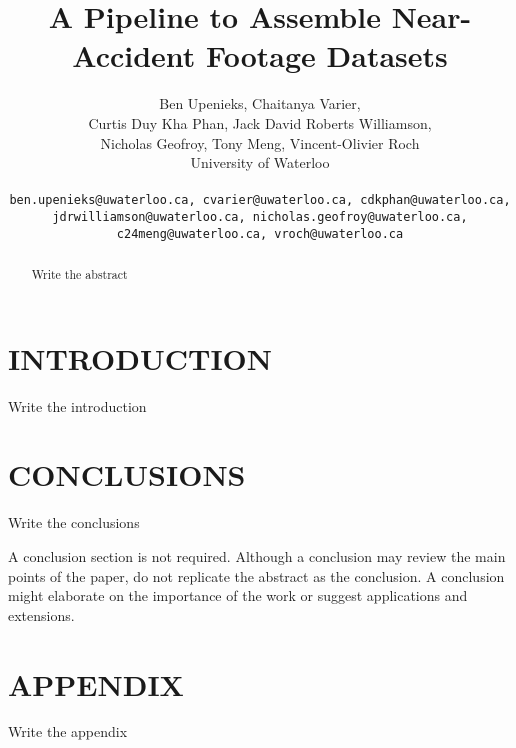 \documentclass[letterpaper, 10 pt, conference]{IEEEconf}
\title{\LARGE \bf
A Pipeline to Assemble Near-Accident Footage Datasets
}
\author{
         Ben Upenieks, Chaitanya Varier,\\
         Curtis Duy Kha Phan, Jack David Roberts Williamson,\\
         Nicholas Geofroy, Tony Meng, Vincent-Olivier Roch\\
         University of Waterloo\\
         \\
         {\tt\small ben.upenieks@uwaterloo.ca, cvarier@uwaterloo.ca, cdkphan@uwaterloo.ca, 
          jdrwilliamson@uwaterloo.ca, nicholas.geofroy@uwaterloo.ca, c24meng@uwaterloo.ca, vroch@uwaterloo.ca}
}
\newcommand{\todo}[1]{{\color{red}#1}}
\begin{document}
\maketitle
\thispagestyle{empty}
\pagestyle{empty}


\begin{abstract}

\todo{Write the abstract}

\end{abstract}

\section{INTRODUCTION}

\todo{Write the introduction}


\section{CONCLUSIONS}

\todo{Write the conclusions}

A conclusion section is not required. Although a conclusion may review the main points of the paper, do not replicate the abstract as the conclusion. A conclusion might elaborate on the importance of the work or suggest applications and extensions. 

\addtolength{\textheight}{-12cm}


\section*{APPENDIX}

\todo{Write the appendix}


\nocite{*}
\printbibliography
\end{document}
